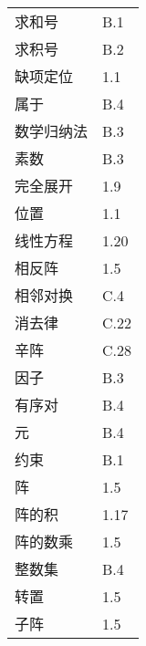 \begin{longtable}[c]{ll}
    求和号                      & B.1  \\
    求积号                      & B.2  \\
    缺项定位                     & 1.1  \\

    属于                       & B.4  \\
    数学归纳法                    & B.3  \\
    素数                       & B.3  \\

    完全展开                     & 1.9  \\
    位置                       & 1.1  \\

    线性方程                     & 1.20 \\
    相反阵                      & 1.5  \\
    相邻对换                     & C.4  \\
    消去律                      & C.22 \\
    辛阵                       & C.28 \\

    因子                       & B.3  \\
    有序对                      & B.4  \\
    元                        & B.4  \\
    约束                       & B.1  \\

    阵                        & 1.5  \\
    阵的积                      & 1.17 \\
    阵的数乘                     & 1.5  \\
    整数集                      & B.4  \\
    转置                       & 1.5  \\
    子阵                       & 1.5  \\
\end{longtable}
